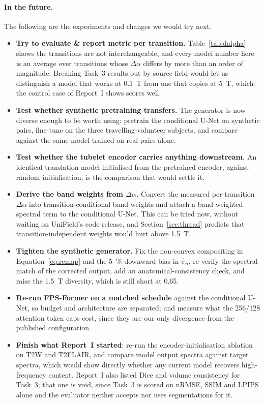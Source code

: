 \documentclass[11pt,a4paper]{article}
\newcommand{\rmse}{nRMSE}
\newcommand{\reportone}{Report~I}
\begin{document}
\paragraph{In the future.} The following are the experiments and changes we would try next.
\begin{itemize}
  \item \textbf{Try to evaluate \& report metric per transition.} Table~\ref{tab:dalpha} shows the transitions are
  not interchangeable, and every model number here is an average over transitions whose $\Delta\alpha$
  differs by more than an order of magnitude. Breaking Task~3 results out by source field would let us
  distinguish a model that works at \SI{0.1}{\tesla} from one that copies at \SI{5}{\tesla}, which the
  control case of \reportone{} shows scores well.
  \item \textbf{Test whether synthetic pretraining transfers.} The generator is now diverse enough to
  be worth using: pretrain the conditional U-Net on synthetic pairs, fine-tune on the three
  travelling-volunteer subjects, and compare against the same model trained on real pairs alone.
  \item \textbf{Test whether the tubelet encoder carries anything downstream.} An identical translation
  model initialised from the pretrained encoder, against random initialisation, is the comparison that
  would settle it.
  \item \textbf{Derive the band weights from $\Delta\alpha$.} Convert the measured per-transition
  $\Delta\alpha$ into transition-conditional band weights and attach a band-weighted spectral term to
  the conditional U-Net. This can be tried now, without waiting on UniField's code release, and
  Section~\ref{sec:thread} predicts that transition-independent weights would hurt above
  \SI{1.5}{\tesla}.
  \item \textbf{Tighten the synthetic generator.} Fix the non-convex compositing in
  Equation~\ref{eq:remap} and the \SI{5}{\percent} downward bias in $\hat{\sigma}_n$, re-verify the
  spectral match of the corrected output, add an anatomical-consistency check, and raise the
  \SI{1.5}{\tesla} diversity, which is still short at \num{0.65}.
  \item \textbf{Re-run FPS-Former on a matched schedule} against the conditional U-Net, so budget and
  architecture are separated; and measure what the 256/128 attention token caps cost, since they are
  our only divergence from the published configuration.
  \item \textbf{Finish what \reportone{} started}: re-run the encoder-initialisation ablation on T2W and
  T2FLAIR, and compare model output spectra against target spectra, which would show directly whether
  any current model recovers high-frequency content. \reportone{} also listed Dice and volume
  consistency for Task~3; that one is void, since Task~3 is scored on \rmse{}, SSIM and LPIPS alone and
  the evaluator neither accepts nor uses segmentations for it.
\end{itemize}
\end{document}
